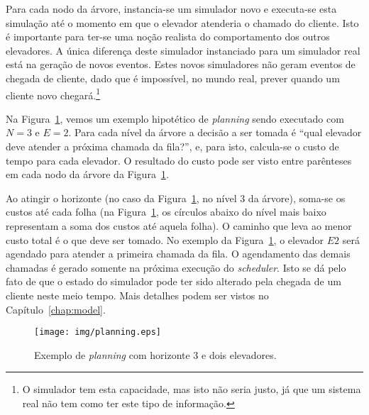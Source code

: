 Para cada nodo da árvore, instancia-se um simulador novo e executa-se esta
simulação até o momento em que o elevador atenderia o chamado do cliente. Isto é
importante para ter-se uma noção realista do comportamento dos outros
elevadores. A única diferença deste simulador instanciado para um simulador real
está na geração de novos eventos. Estes novos simuladores não geram eventos de
chegada de cliente, dado que é impossível, no mundo real, prever quando um
cliente novo chegará.\footnote{O simulador tem esta capacidade, mas isto não
  seria justo, já que um sistema real não tem como ter este tipo de informação.}

Na Figura~\ref{fig:planning}, vemos um exemplo hipotético de \textit{planning}
sendo executado com $N = 3$ e $E = 2$. Para cada nível da árvore a decisão a ser
tomada é ``qual elevador deve atender a próxima chamada da fila?'', e, para
isto, calcula-se o custo de tempo para cada elevador. O resultado do custo
pode ser visto entre parênteses em cada nodo da árvore da
Figura~\ref{fig:planning}.

Ao atingir o horizonte (no caso da Figura~\ref{fig:planning}, no nível 3 da
árvore), soma-se os custos até cada folha (na Figura~\ref{fig:planning}, os
círculos abaixo do nível mais baixo representam a soma dos custos até aquela
folha). O caminho que leva ao menor custo total é o que deve ser tomado. No
exemplo da Figura~\ref{fig:planning}, o elevador $E2$ será agendado para atender
a primeira chamada da fila. O agendamento das demais chamadas é gerado somente
na próxima execução do \textit{scheduler}. Isto se dá pelo fato de que o estado
do simulador pode ter sido alterado pela chegada de um cliente neste meio tempo.
Mais detalhes podem ser vistos no Capítulo~\ref{chap:model}.

\begin{figure}[htb!]
  \centering
  \texttt{[image: img/planning.eps]}
  \caption{Exemplo de \textit{planning} com horizonte 3 e dois elevadores.}
\label{fig:planning}
\end{figure}